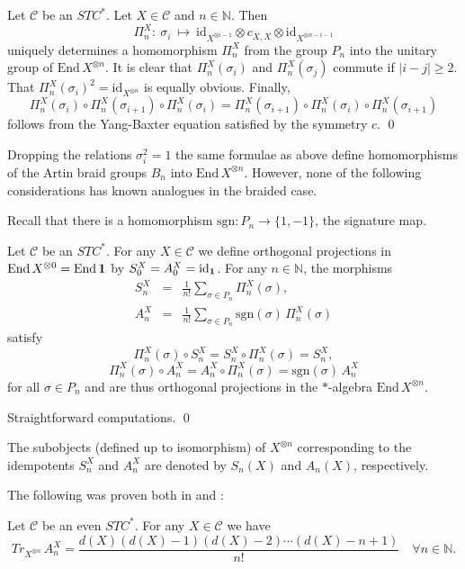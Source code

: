 \documentclass[11pt]{article}
\theoremstyle{definition}
\theoremstyle{definition}
\theoremstyle{remark}
\def\2#1{{\mathcal #1}}
\def\7#1{{\mathbb #1}}
\def\1#1{{\bf #1}}
\newcommand{\End}{\mathrm{End}}
\newcommand{\mcirc}{\circ}
\newcommand{\rarr}{\rightarrow}
\def\id{\mathrm{id}}
\begin{document}
\blemma Let $\2C$ be an $STC^*$. Let $X\in\2C$ and $n\in\7N$. Then 
\[ \Pi^X_n: \ \sigma_i \ \mapsto \ \id_{X^{\otimes i-1}}\otimes c_{X,X}\otimes\id_{X^{\otimes
  n-i-1}} \] 
uniquely determines a homomorphism $\Pi^X_n$ from the group $P_n$ into the unitary group of
$\End\,X^{\otimes n}$. 
\elemma
\prf It is clear that $\Pi^X_n(\sigma_i)$ and $\Pi^X_n(\sigma_j)$ commute if $|i-j|\ge 2$. 
That $\Pi^X_n(\sigma_i)^2=\id_{X^{\otimes n}}$ is equally obvious. Finally, 
\[ \Pi^X_n(\sigma_i)\mcirc \Pi^X_n(\sigma_{i+ 1})\mcirc \Pi^X_n(\sigma_i)=
  \Pi^X_n(\sigma_{i+ 1})\mcirc \Pi^X_n(\sigma_i)\mcirc \Pi^X_n(\sigma_{i+ 1})  \]
follows from the Yang-Baxter equation satisfied by the symmetry $c$.
\qed

\brem 
Dropping the relations $\sigma_i^2=1$ the same formulae as above define homomorphisms of the Artin
braid groups $B_n$ into $\End\,X^{\otimes n}$. However, none of the following considerations has
known analogues in the braided case. 
\erem

Recall that there is a homomorphism $\mathrm{sgn}: P_n\rarr\{1,-1\}$, the signature map.

\blemma \label{l-proj} 
Let $\2C$ be an $STC^*$. For any $X\in\2C$ we define orthogonal projections in 
$\End\,X^{\otimes 0}=\End\,\11$ by $S_0^X=A_0^X=\id_\11$. For any $n\in\7N$, the morphisms 
\begin{eqnarray*} 
S_n^X &=& \frac{1}{n!} \sum_{\sigma\in P_n} \Pi_n^X(\sigma), \\
A_n^X &=& \frac{1}{n!} \sum_{\sigma\in P_n} \mathrm{sgn}(\sigma) \,\Pi_n^X(\sigma)
\end{eqnarray*}
satisfy 
\[ \Pi_n^X(\sigma) \mcirc  S_n^X = S_n^X\mcirc  \Pi_n^X(\sigma) = S_n^X, \]
\[ \Pi_n^X(\sigma) \mcirc  A_n^X = A_n^X\mcirc  \Pi_n^X(\sigma) =  \mathrm{sgn}(\sigma)\,A_n^X \]
for all $\sigma\in P_n$ and are thus orthogonal projections in the $*$-algebra $\End\,X^{\otimes n}$. 
\elemma

\prf Straightforward computations. \qed

\bdefin 
The subobjects (defined up to isomorphism) of $X^{\otimes n}$ corresponding to the idempotents
$S_n^X$ and $A_n^X$ are denoted by $S_n(X)$ and $A_n(X)$, respectively.
\edefin

The following was proven both in \cite{DR} and \cite{del}:

\bprop \label{p-trace-an} 
Let $\2C$ be an even $STC^*$. For any $X\in\2C$ we have
\begin{equation} \label{e-traxn}
Tr_{X^{\otimes n}}\,A_n^X = \frac{d(X)(d(X)-1)(d(X)-2)\cdots (d(X)-n+1)}{n!} \quad \forall n\in\7N.
\end{equation}
\eprop
\end{document}

